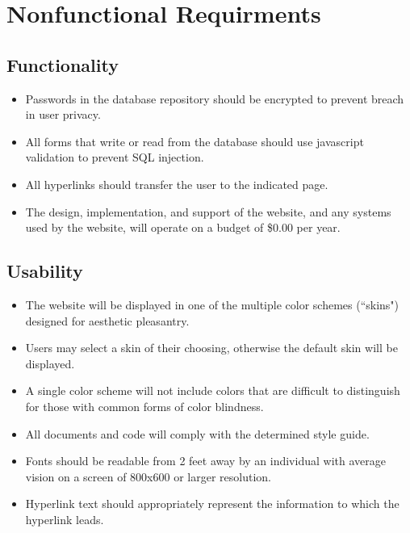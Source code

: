 %

\section{Nonfunctional Requirments}

	\subsection{Functionality}
	\begin{itemize}
		\item Passwords in the database repository should be encrypted to prevent breach in user privacy.
		\item All forms that write or read from the database should use javascript validation to prevent SQL injection.
		\item All hyperlinks should transfer the user to the indicated page.
		\item The design, implementation, and support of the website, and any systems used by the website, will operate on a budget of \$0.00 per year.
	\end{itemize}
	
	\subsection{Usability}
	\begin{itemize}
		\item The website will be displayed in one of the multiple color schemes (``skins") designed for aesthetic pleasantry.
		\item Users may select a skin of their choosing, otherwise the default skin will be displayed.
		\item A single color scheme will not include colors that are difficult to distinguish for those with common forms of color blindness.
		\item All documents and code will comply with the determined style guide.
		\item Fonts should be readable from 2 feet away by an individual with average vision on a screen of 800x600 or larger resolution.
		\item Hyperlink text should appropriately represent the information to which the hyperlink leads.
	\end{itemize}
	
